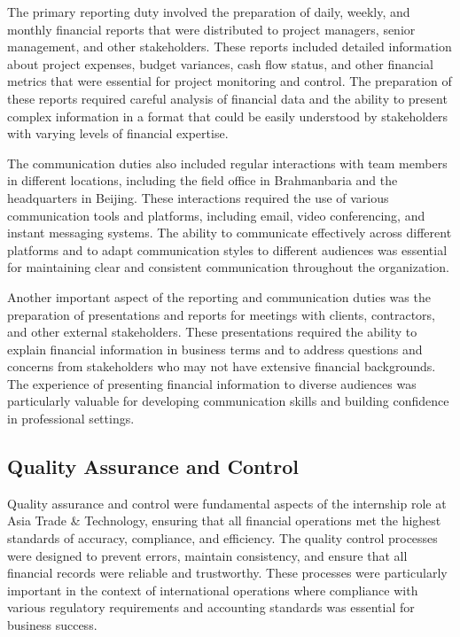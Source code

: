 The primary reporting duty involved the preparation of daily, weekly, and monthly financial reports that were distributed to project managers, senior management, and other stakeholders. These reports included detailed information about project expenses, budget variances, cash flow status, and other financial metrics that were essential for project monitoring and control. The preparation of these reports required careful analysis of financial data and the ability to present complex information in a format that could be easily understood by stakeholders with varying levels of financial expertise.

The communication duties also included regular interactions with team members in different locations, including the field office in Brahmanbaria and the headquarters in Beijing. These interactions required the use of various communication tools and platforms, including email, video conferencing, and instant messaging systems. The ability to communicate effectively across different platforms and to adapt communication styles to different audiences was essential for maintaining clear and consistent communication throughout the organization.

Another important aspect of the reporting and communication duties was the preparation of presentations and reports for meetings with clients, contractors, and other external stakeholders. These presentations required the ability to explain financial information in business terms and to address questions and concerns from stakeholders who may not have extensive financial backgrounds. The experience of presenting financial information to diverse audiences was particularly valuable for developing communication skills and building confidence in professional settings.

\subsection{Quality Assurance and Control}
Quality assurance and control were fundamental aspects of the internship role at Asia Trade \& Technology, ensuring that all financial operations met the highest standards of accuracy, compliance, and efficiency. The quality control processes were designed to prevent errors, maintain consistency, and ensure that all financial records were reliable and trustworthy. These processes were particularly important in the context of international operations where compliance with various regulatory requirements and accounting standards was essential for business success.

